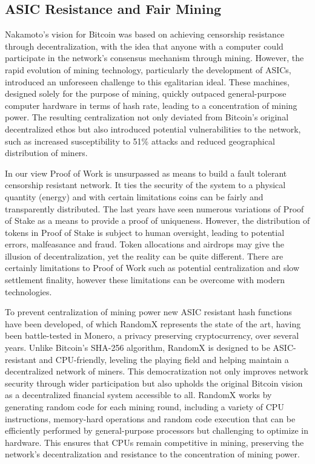 \documentclass{article}
\begin{document}
\subsection*{ASIC Resistance and Fair Mining}

Nakamoto's vision for Bitcoin was based on achieving censorship resistance through decentralization, with the idea that anyone with a computer could participate in the network's consensus mechanism through mining. However, the rapid evolution of mining technology, particularly the development of ASICs, introduced an unforeseen challenge to this egalitarian ideal. These machines, designed solely for the purpose of mining, quickly outpaced general-purpose computer hardware in terms of hash rate, leading to a concentration of mining power. The resulting centralization not only deviated from Bitcoin's original decentralized ethos but also introduced potential vulnerabilities to the network, such as increased susceptibility to 51\% attacks and reduced geographical distribution of miners.

In our view Proof of Work is unsurpassed as means to build a fault tolerant censorship resistant network. It ties the security of the system to a physical quantity (energy) and with certain limitations coins can be fairly and transparently distributed. The last years have seen numerous variations of Proof of Stake as a means to provide a proof of uniqueness. However, the distribution of tokens in Proof of Stake is subject to human oversight, leading to potential errors, malfeasance and fraud. Token allocations and airdrops may give the illusion of decentralization, yet the reality can be quite different. There are certainly limitations to Proof of Work such as potential centralization and slow settlement finality, however these limitations can be overcome with modern technologies.

To prevent centralization of mining power new ASIC resistant hash functions have been developed, of which RandomX represents the state of the art, having been battle-tested in Monero, a privacy preserving cryptocurrency, over several years. Unlike Bitcoin's SHA-256 algorithm, RandomX is designed to be ASIC-resistant and CPU-friendly, leveling the playing field and helping maintain a decentralized network of miners. This democratization not only improves network security through wider participation but also upholds the original Bitcoin vision as a decentralized financial system accessible to all. RandomX works by generating random code for each mining round, including a variety of CPU instructions, memory-hard operations and random code execution that can be efficiently performed by general-purpose processors but challenging to optimize in hardware. This ensures that CPUs remain competitive in mining, preserving the network's decentralization and resistance to the concentration of mining power.
\end{document}

